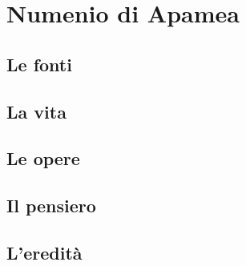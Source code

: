 \chapter{Numenio di Apamea}

\section{Le fonti}

\section{La vita}

\section{Le opere}

\section{Il pensiero}

\section{L'eredità}
